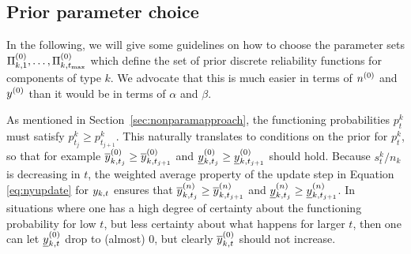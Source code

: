 \documentclass[12pt, a4paper]{elsarticle}
\def\tmax{t_\text{max}}
\newcommand{\ptk}{p^k_t}
\begin{document}
\subsection{Prior parameter choice}

In the following, we will give some guidelines on how to choose the parameter sets $\PkZi{1}, \ldots, \PkZi{\tmax}$
which define the set of prior discrete reliability functions for components of type $k$.
We advocate that this is much easier in terms of $n^{(0)}$ and $y^{(0)}$ than it would be in terms of $\alpha$ and $\beta$.

As mentioned in Section~\ref{sec:nonparamapproach}, the functioning probabilities $\ptk$
must satisfy $p^k_{t_j} \ge p^k_{t_{j+1}}$.%
This naturally translates to conditions on the prior for $\ptk$,
so that for example 
$\overline{y}^{(0)}_{k,t_j} \ge \overline{y}^{(0)}_{k,t_{j+1}}$ and $\underline{y}^{(0)}_{k,t_j} \ge \underline{y}^{(0)}_{k,t_{j+1}}$ should hold.
Because $s^k_t/n_k$ is decreasing in $t$, the weighted average property of the update step in
Equation \eqref{eq:nyupdate} for $y_{k,t}$ ensures that 
$\overline{y}^{(n)}_{k,t_j} \ge \overline{y}^{(n)}_{k,t_{j+1}}$ and $\underline{y}^{(n)}_{k,t_j} \ge \underline{y}^{(n)}_{k,t_{j+1}}$.
In situations where one has a high degree of certainty about the functioning probability for low $t$,
but less certainty about what happens for larger $t$,
then one can let $\underline{y}^{(0)}_{k,t}$ drop to (almost) 0, but clearly $\overline{y}^{(0)}_{k,t}$ should not increase.
\end{document}
